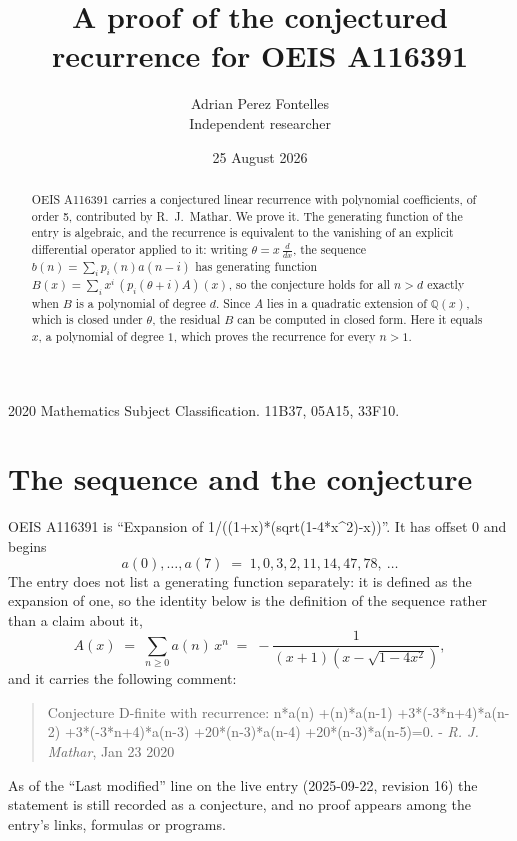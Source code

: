 \documentclass[11pt,a4paper]{article}
\title{A proof of the conjectured recurrence for OEIS A116391}
\author{Adrian Perez Fontelles\\ \small Independent researcher}
\date{25 August 2026}
\theoremstyle{plain}
\theoremstyle{definition}
\begin{document}
\maketitle

\begin{abstract}
OEIS A116391 carries a conjectured linear recurrence with polynomial coefficients, of
order 5, contributed by R.~J.~Mathar. We prove it. The generating function of the
entry is algebraic, and the recurrence is equivalent to the vanishing of an explicit
differential operator applied to it: writing $\theta=x\,\frac{d}{dx}$, the sequence
$b(n)=\sum_{i}p_{i}(n)a(n-i)$ has generating function
$B(x)=\sum_{i}x^{i}\,(p_{i}(\theta+i)A)(x)$, so the conjecture holds for all $n>d$ exactly
when $B$ is a polynomial of degree $d$. Since $A$ lies in a quadratic extension of
$\mathbb{Q}(x)$, which is closed under $\theta$, the residual $B$ can be computed in
closed form. Here it equals $x$, a polynomial of degree $1$, which proves
the recurrence for every $n>1$.
\end{abstract}

\noindent\small 2020 Mathematics Subject Classification. 11B37, 05A15, 33F10.\normalsize

\section{The sequence and the conjecture}

OEIS A116391 is ``Expansion of 1/((1+x)*(sqrt(1-4*x\^{}2)-x))''. It has offset $0$ and begins
\[
a(0),\dots,a(7)\;=\;1, 0, 3, 2, 11, 14, 47, 78,\ \dots
\]
The entry does not list a generating function separately: it is defined as the
expansion of one, so the identity below is the definition of the sequence rather than a
claim about it,
\begin{equation}\label{eq:gf}
A(x)\;=\;\sum_{n\ge 0} a(n)\,x^{n}\;=\;- \frac{1}{\left(x + 1\right) \left(x - \sqrt{1 - 4 x^{2}}\right)} ,
\end{equation}
and it carries the following comment:
\begin{quote}\small
Conjecture D-finite with recurrence: n*a(n) +(n)*a(n-1) +3*(-3*n+4)*a(n-2) +3*(-3*n+4)*a(n-3) +20*(n-3)*a(n-4) +20*(n-3)*a(n-5)=0. - \emph{R. J. Mathar}, Jan 23 2020
\end{quote}
As of the ``Last modified'' line on the live entry (2025-09-22, revision 16) the
statement is still recorded as a conjecture, and no proof appears among the entry's links,
formulas or programs.
\end{document}

